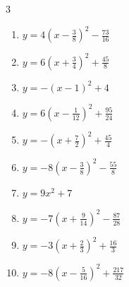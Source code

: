 \begin{multicols}{3}
\begin{enumerate}
  \item $\displaystyle y=4\left( x-\frac{3}{8}\right)^{2}-\frac{73}{16}$


  \item $\displaystyle y=6\left( x+\frac{3}{4}\right)^{2}+\frac{45}{8}$


  \item $\displaystyle y=-\left( x-1\right)^{2}+4$

        \phantom{$\displaystyle 頂点\left( 1 , 4 \right)$}

  \item $\displaystyle y=6\left( x-\frac{1}{12}\right)^{2}+\frac{95}{24}$


  \item $\displaystyle y=-\left( x+\frac{7}{2}\right)^{2}+\frac{45}{4}$


  \item $\displaystyle y=-8\left( x-\frac{3}{8}\right)^{2}-\frac{55}{8}$


\columnbreak %

  \item $\displaystyle y=9x^{2}+7$

        \phantom{$\displaystyle 頂点\left( 0 , 7 \right)$}

  \item $\displaystyle y=-7\left( x+\frac{9}{14}\right)^{2}-\frac{87}{28}$


  \item $\displaystyle y=-3\left( x+\frac{2}{3}\right)^{2}+\frac{16}{3}$


  \item $\displaystyle y=-8\left( x-\frac{5}{16}\right)^{2}+\frac{217}{32}$


\end{enumerate}
\end{multicols}
